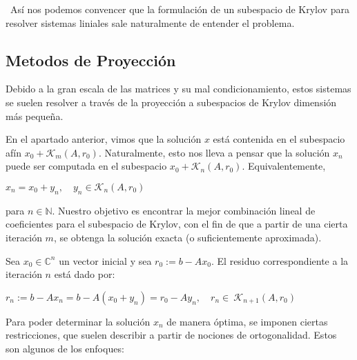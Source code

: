 \documentclass[12pt, oneside]{book}
\begin{document}
\ Así nos podemos convencer que la formulación de un subespacio de Krylov para resolver sistemas liniales sale naturalmente de entender el problema.

	\subsection{Metodos de Proyección}
Debido a la gran escala de las matrices y su mal condicionamiento, estos sistemas se suelen resolver a través de la proyección a subespacios de Krylov dimensión más pequeña. 

En el apartado anterior, vimos que la solución $x$ está contenida en el subespacio afín $x_0 + \mathcal{K}_m(A, r_0)$. Naturalmente, esto nos lleva a pensar que la solución $x_n$ puede ser computada en el subespacio $x_0 + \mathcal{K}_n(A, r_0)$. Equivalentemente,
\begin{center}
	$x_n = x_0 + y_n, \quad  y_n \in \mathcal{K}_n(A, r_0)$
\end{center}
para $n \in \mathbb{N}$. Nuestro objetivo es encontrar la mejor combinación lineal de coeficientes para el subespacio de Krylov, con el fin de que a partir de una cierta iteración $m$, se obtenga la solución exacta (o suficientemente aproximada).

Sea $x_0 \in \mathbb{C}^n$ un vector inicial y sea $r_0 := b - Ax_0$. El residuo correspondiente a la iteración $n$ está dado por:
\begin{center}
	$r_n := b - Ax_n = b - A(x_0 + y_n) = r_0 - Ay_n, \quad r_n\in \ \mathcal{K}_{n+1}(A, r_0)$
\end{center}
Para poder determinar la solución $x_n$ de manera óptima, se imponen ciertas restricciones, que suelen describir a partir de nociones de ortogonalidad. Estos son algunos de los enfoques:
\end{document}
